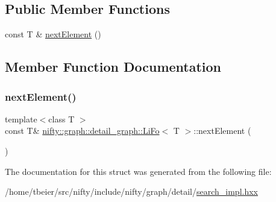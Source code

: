 \subsection*{Public Member Functions}
\begin{DoxyCompactItemize}
\item 
const T \& \hyperlink{structnifty_1_1graph_1_1detail__graph_1_1LiFo_aeb157b0d46420c9e32708e782891ceb1}{next\+Element} ()
\end{DoxyCompactItemize}


\subsection{Member Function Documentation}
\mbox{\label{structnifty_1_1graph_1_1detail__graph_1_1LiFo_aeb157b0d46420c9e32708e782891ceb1}} 
\subsubsection{\texorpdfstring{next\+Element()}{nextElement()}}
{\footnotesize\ttfamily template$<$class T $>$ \\
const T\& \hyperlink{structnifty_1_1graph_1_1detail__graph_1_1LiFo}{nifty\+::graph\+::detail\+\_\+graph\+::\+Li\+Fo}$<$ T $>$\+::next\+Element (\begin{DoxyParamCaption}{ }\end{DoxyParamCaption})\hspace{0.3cm}{\ttfamily [inline]}}



The documentation for this struct was generated from the following file\+:\begin{DoxyCompactItemize}
\item 
/home/tbeier/src/nifty/include/nifty/graph/detail/\hyperlink{search__impl_8hxx}{search\+\_\+impl.\+hxx}\end{DoxyCompactItemize}
